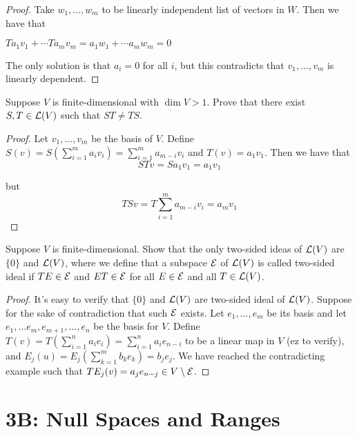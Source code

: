 \documentclass{extarticle}
\begin{document}
\begin{proof}
Take \(w_1, \ldots, w_m\) to be linearly independent list of vectors in \(W\). Then we have that 

\(Ta_1 v_1 + \cdots T a_m v_m = a_1 w_1 + \cdots a_m w_m = 0\)

The only solution is that \(a_i = 0\) for all \(i\), but this contradicts that \(v_1, \ldots, v_m\)
is linearly dependent. 
\end{proof}

\begin{problem}{16}
    Suppose \(V\) is finite-dimensional with \(\dim V > 1\). Prove that there exist \(S, T \in \mathcal{L}(V)\)
    such that \(ST \neq TS\). 
\end{problem}

\begin{proof}
Let \(v_1, \ldots, v_m\) be the basis of \(V\). Define \(S (v) = S(\sum_{i=1}^{m}a_i v_i)
= \sum_{i=1}^{m} a_{m - i} v_i\) and \(T(v) = a_1 v_1\). Then we have that 
\[ST v = S a_1v_1 = a_1 v_1\]

but 
\[T S v = T \sum_{i=1}^{m} a_{m - i} v_i = a_m v_1\]
\end{proof}

\begin{problem}{17}
    Suppose \(V\) is finite-dimensional. Show that the only two-sided ideas of \(\mathcal{L}(V)\)
    are \(\{0\}\) and \(\mathcal{L}(V)\), where we define that a subspace \(\mathcal{E}\) of \(\mathcal{L}(V)\)
    is called two-sided ideal if \(T E \in \mathcal{E}\) and \(ET \in \mathcal{E}\) for all \(E \in \mathcal{E}\)
    and all \(T \in \mathcal{L}(V)\). 
\end{problem}

\begin{proof}
It's easy to verify that \(\{0\}\) and \(\mathcal{L}(V)\) are two-sided ideal of \(\mathcal{L}(V)\). Suppose for 
the sake of contradiction that such \(\mathcal{E}\) exists. Let \(e_1, \ldots, e_m\) be its basis and let 
\(e_1, \ldots e_m, e_{m+1}, \ldots, e_n\) be the basis for \(V\). Define \(T(v) = 
T(\sum_{i=1}^{n}a_i e_i) = \sum_{i=1}^{n}a_i e_{n-i}\) to be a linear map in \(V\) (ez to verify), and 
\(E_j (u) = E_j(\sum_{k=1}^{m}b_k e_k) = b_j e_j\). We have reached the contradicting example such 
that \(TE_j (v) = a_j e_{n - j} \in V \setminus \mathcal{E}\). 
\end{proof}

\newpage 

\section*{3B: Null Spaces and Ranges}
\end{document}
